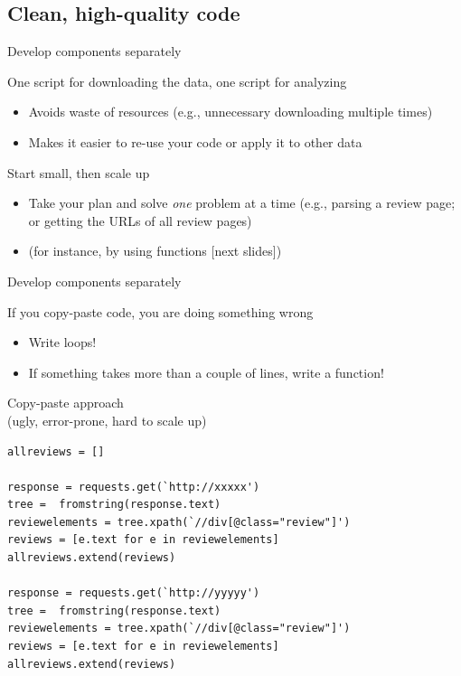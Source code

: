 \documentclass{beamer}
\begin{document}
\subsection{Clean, high-quality code}
\begin{frame}{Develop components separately}
	\begin{block}{One script for downloading the data, one script for analyzing}
		\begin{itemize}[<+->]
			\item Avoids waste of resources (e.g., unnecessary downloading multiple times)
			\item Makes it easier to re-use your code or apply it to other data
		\end{itemize}
	\end{block}
\pause
\begin{block}{Start small, then scale up}
	\begin{itemize}[<+->]
		\item Take your plan and solve \textit{one} problem at a time (e.g., parsing a review page; or getting the URLs of all review pages)
		\item (for instance, by using functions [next slides])
	\end{itemize}
\end{block}

\end{frame}	

\begin{frame}{Develop components separately}
	\begin{block}{If you copy-paste code, you are doing something wrong}
		\begin{itemize}[<+->]
			\item Write loops!
			\item If something takes more than a couple of lines, write a function!
		\end{itemize}
	\end{block}
\end{frame}

\begin{frame}
Copy-paste approach\\ (ugly, error-prone, hard to scale up)
\begin{lstlisting}
allreviews = []

response = requests.get(`http://xxxxx')
tree =  fromstring(response.text)
reviewelements = tree.xpath(`//div[@class="review"]')
reviews = [e.text for e in reviewelements]
allreviews.extend(reviews)

response = requests.get(`http://yyyyy')
tree =  fromstring(response.text)
reviewelements = tree.xpath(`//div[@class="review"]')
reviews = [e.text for e in reviewelements]
allreviews.extend(reviews)
\end{lstlisting}
\end{frame}
\end{document}
